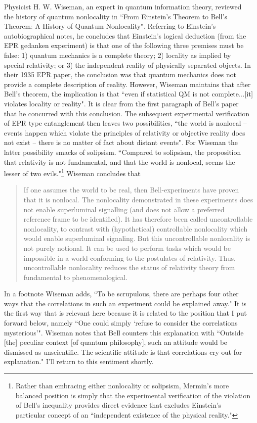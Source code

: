 \documentclass[12pt]{article}
\begin{document}
Physicist H. W. Wiseman, an expert in quantum information theory, reviewed the history of quantum nonlocality in ``From Einstein's Theorem to Bell's Theorem: A History of Quantum Nonlocality"\cite{Wis06}. Referring to Einstein's autobiographical notes\cite{Ein49}, he concludes that Einstein's logical deduction (from the EPR gedanken experiment) is that one of the following three premises must be false: 1) quantum mechanics is a complete theory; 2) locality as implied by special relativity; or 3) the independent reality of physically separated objects. In their 1935 EPR paper, the conclusion was that quantum mechanics does not provide a complete description of reality. However, Wiseman maintains that after Bell's theorem, the implication is that ``even if statistical QM is not complete...[it] violates locality or reality". It is clear from the first paragraph of Bell's paper\cite{Bel64} that he concurred with this conclusion. The subsequent experimental verification of EPR type entanglement then leaves two possibilities, ``the world is nonlocal -- events happen which violate the principles of relativity or objective reality does not exist -- there is no matter of fact about distant events"\cite{Wis06}. For Wiseman the latter possibility smacks of solipsism. ``Compared to solipsism, the proposition that relativity is not fundamental, and that the world is nonlocal, seems the lesser of two evils."\footnote{Rather than embracing either nonlocality or solipsism, Mermin's\cite{Mer85} more balanced position is simply that the experimental verification of the violation of Bell's inequality provides direct evidence that excludes Einstein's particular concept of an ``independent existence of the physical reality."}  Wiseman concludes that
\begin{quote}
If one assumes the world to be real, then Bell-experiments have proven that it is nonlocal. The nonlocality demonstrated in these experiments does not enable superluminal signalling (and does not allow a preferred reference frame to be identified). It has therefore been called uncontrollable nonlocality, to contrast with (hypothetical) controllable nonlocality which would enable superluminal signaling. But this uncontrollable nonlocality is not purely notional. It can be used to perform tasks which would be impossible in a world conforming to the postulates of relativity. Thus, uncontrollable nonlocality reduces the status of relativity theory from fundamental to phenomenological.
\end{quote}
In a footnote Wiseman adds, ``To be scrupulous, there are perhaps four other ways that the correlations in such an experiment could be explained away." It is the first way that is relevant here because it is related to the position that I put forward below, namely ``One could simply `refuse to consider the correlations mysterious'". Wiseman notes that Bell counters this explanation with\cite{Bel81} ``Outside [the] peculiar context [of quantum philosophy], such an attitude would be dismissed as unscientific. The scientific attitude is that correlations cry out for explanation." I'll return to this sentiment shortly.
\end{document}
